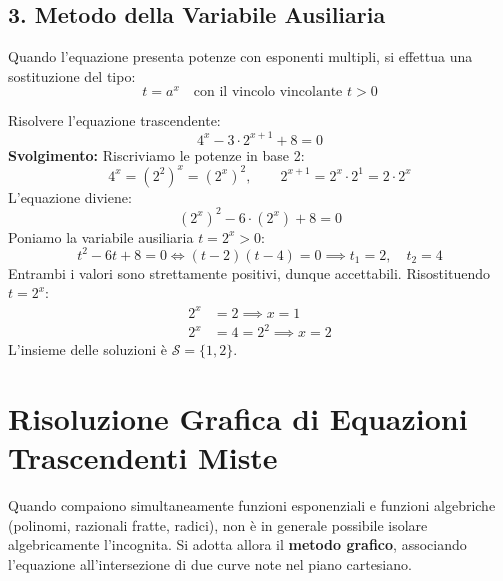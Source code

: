 \documentclass[11pt,a4paper,oneside]{report}
\begin{document}
\subsection{3. Metodo della Variabile Ausiliaria}
Quando l'equazione presenta potenze con esponenti multipli, si effettua una sostituzione del tipo:
\begin{equation}
    t = a^x \quad \text{con il vincolo vincolante } t > 0
\end{equation}

\begin{esercizio}
Risolvere l'equazione trascendente:
\begin{equation*}
    4^x - 3 \cdot 2^{x+1} + 8 = 0
\end{equation*}
\textbf{Svolgimento:}
Riscriviamo le potenze in base 2:
\begin{equation*}
    4^x = (2^2)^x = (2^x)^2, \qquad 2^{x+1} = 2^x \cdot 2^1 = 2 \cdot 2^x
\end{equation*}
L'equazione diviene:
\begin{equation*}
    (2^x)^2 - 6 \cdot (2^x) + 8 = 0
\end{equation*}
Poniamo la variabile ausiliaria $t = 2^x > 0$:
\begin{equation*}
    t^2 - 6t + 8 = 0 \iff (t - 2)(t - 4) = 0 \implies t_1 = 2, \quad t_2 = 4
\end{equation*}
Entrambi i valori sono strettamente positivi, dunque accettabili. Risostituendo $t = 2^x$:
\begin{align*}
    2^x &= 2 \implies x = 1 \\
    2^x &= 4 = 2^2 \implies x = 2
\end{align*}
L'insieme delle soluzioni è $\mathcal{S} = \{1, 2\}$.
\end{esercizio}

\section{Risoluzione Grafica di Equazioni Trascendenti Miste}
Quando compaiono simultaneamente funzioni esponenziali e funzioni algebriche (polinomi, razionali fratte, radici), non è in generale possibile isolare algebricamente l'incognita. Si adotta allora il \textbf{metodo grafico}, associando l'equazione all'intersezione di due curve note nel piano cartesiano.
\end{document}
